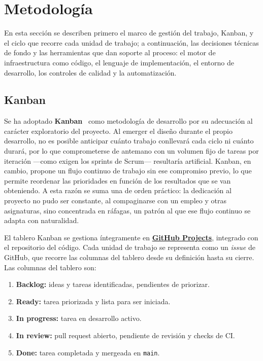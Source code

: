 \section{Metodología}

En esta sección se describen primero el marco de gestión del trabajo, Kanban, y el ciclo
que recorre cada unidad de trabajo; a continuación, las decisiones técnicas de fondo y las
herramientas que dan soporte al proceso: el motor de infraestructura como código, el lenguaje
de implementación, el entorno de desarrollo, los controles de calidad y la automatización.

\subsection{Kanban}

Se ha adoptado \textbf{Kanban}~\cite{kanbanAtlassian} como metodología de desarrollo por su adecuación
al carácter exploratorio del proyecto. Al emerger el diseño durante el propio
desarrollo, no es posible anticipar cuánto trabajo conllevará cada ciclo ni cuánto
durará, por lo que comprometerse de antemano con un volumen fijo de tareas por
iteración —como exigen los sprints de Scrum— resultaría artificial. Kanban, en
cambio, propone un flujo continuo de trabajo sin ese compromiso previo, lo que permite
reordenar las prioridades en función de los resultados que se van obteniendo. A esta
razón se suma una de orden práctico: la dedicación al proyecto no pudo ser constante,
al compaginarse con un empleo y otras asignaturas, sino concentrada en ráfagas, un
patrón al que ese flujo continuo se adapta con naturalidad.

El tablero Kanban se gestiona íntegramente en
\textbf{\href{https://github.com/users/lucpez/projects/2}{GitHub Projects}}, integrado
con el repositorio del código. Cada unidad de trabajo se representa como un
\textit{issue} de GitHub, que recorre las columnas del tablero desde su definición
hasta su cierre. Las columnas del tablero son:

\begin{enumerate}
    \item \textbf{Backlog:} ideas y tareas identificadas, pendientes de priorizar.
    \item \textbf{Ready:} tarea priorizada y lista para ser iniciada.
    \item \textbf{In progress:} tarea en desarrollo activo.
    \item \textbf{In review:} pull request abierto, pendiente de revisión y checks de CI.
    \item \textbf{Done:} tarea completada y mergeada en \texttt{main}.
\end{enumerate}

